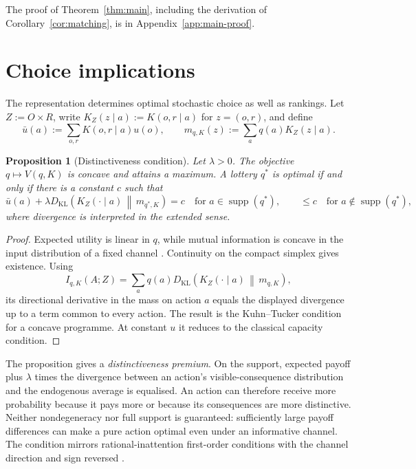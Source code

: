 \documentclass[11pt,a4paper]{article}
\newtheorem{proposition}[theorem]{Proposition}
\theoremstyle{definition}
\newcommand{\supp}{\operatorname{supp}}
\newcommand{\KL}{D_{\mathrm{KL}}}
\newcommand{\1}{\mathbf 1}
\begin{document}
The proof of Theorem~\ref{thm:main}, including the derivation of Corollary~\ref{cor:matching}, is in
Appendix~\ref{app:main-proof}.

\section{Choice implications}

The representation determines optimal stochastic choice as well as rankings.  Let $Z:=O\times R$, write
$K_Z(z\mid a):=K(o,r\mid a)$ for $z=(o,r)$, and define
\[
 \bar u(a):=\sum_{o,r}K(o,r\mid a)u(o),
 \qquad
 m_{q,K}(z):=\sum_aq(a)K_Z(z\mid a).
\]

\begin{proposition}[Distinctiveness condition]\label{prop:optimal-choice}
Let $\lambda>0$.  The objective $q\mapsto V(q,K)$ is concave and attains a maximum.  A lottery $q^*$ is optimal if
and only if there is a constant $c$ such that
\[
 \bar u(a)+\lambda\KL\!\left(K_Z(\cdot\mid a)\,\middle\|\,m_{q^*,K}\right)=c
 \quad\text{for }a\in\supp(q^*),
 \qquad
 \le c\quad\text{for }a\notin\supp(q^*),
\]
where divergence is interpreted in the extended sense.
\end{proposition}

\begin{proof}
Expected utility is linear in $q$, while mutual information is concave in the input distribution of a fixed channel
\cite{CoverThomas2006}.  Continuity on the compact simplex gives existence.  Using
\[
 I_{q,K}(A;Z)=\sum_aq(a)\KL\!\left(K_Z(\cdot\mid a)\,\middle\|\,m_{q,K}\right),
\]
its directional derivative in the mass on action $a$ equals the displayed divergence up to a term common to every
action.  The result is the Kuhn--Tucker condition for a concave programme.  At constant $u$ it reduces to the classical
capacity condition.
\end{proof}

The proposition gives a \emph{distinctiveness premium}.  On the support, expected payoff plus $\lambda$ times the
divergence between an action's visible-consequence distribution and the endogenous average is equalised.  An action
can therefore receive more probability because it pays more or because its consequences are more distinctive.
Neither nondegeneracy nor full support is guaranteed: sufficiently large payoff differences can make a pure action
optimal even under an informative channel.  The condition mirrors rational-inattention first-order conditions with the
channel direction and sign reversed \cite{Sims2003,MatejkaMcKay2015}.
\end{document}
